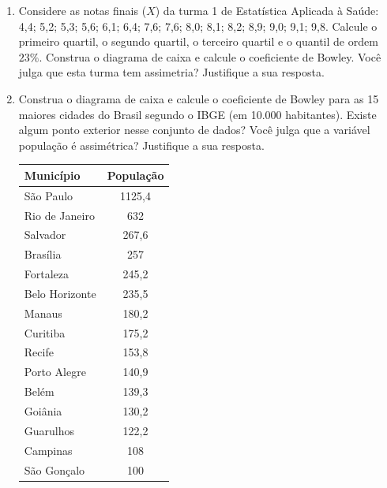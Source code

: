 \documentclass[12pt, a4paper]{article}
\begin{document}
\begin{enumerate}[1-]
	\item Considere as notas finais ($X$) da turma 1 de Estatística Aplicada à Saúde: 4,4; 5,2; 5,3; 5,6; 6,1; 6,4; 7,6; 7,6; 8,0; 8,1; 8,2; 8,9; 9,0; 9,1; 9,8. Calcule o primeiro quartil, o segundo quartil, o terceiro quartil e o quantil de ordem $23\%$. Construa o diagrama de caixa e calcule o coeficiente de Bowley. Você julga que esta turma tem assimetria? Justifique a sua resposta.
	\item Construa o diagrama de caixa e calcule o coeficiente de Bowley para as 15 maiores cidades do Brasil segundo o IBGE (em 10.000 habitantes). Existe algum ponto exterior nesse conjunto de dados? Você julga que a variável população é assimétrica? Justifique a sua resposta.
	\begin{table}[hbtp]
		\centering
		\begin{tabular}{l|c}
			\toprule
			Município & População\\ \midrule
			São Paulo & 1125,4\\
			Rio de Janeiro & 632 \\
			Salvador & 267,6\\
			Brasília & 257\\
			Fortaleza & 245,2\\
			Belo Horizonte & 235,5\\
			Manaus & 180,2\\
			Curitiba & 175,2\\
			Recife & 153,8\\
			Porto Alegre & 140,9\\
			Belém & 139,3\\
			Goiânia & 130,2\\
			Guarulhos & 122,2\\
			Campinas & 108 \\
			São Gonçalo & 100\\ \bottomrule
		\end{tabular}
	\end{table}
	

\end{enumerate}
\end{document}
